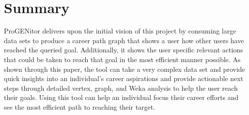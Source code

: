 \section{Summary}
\label{sect:summary}
ProGENitor delivers upon the initial vision of this project by consuming large
data sets to produce a career path graph that shows a user how other users
have reached the queried goal.  Additionally, it shows the user specific relevant actions
that could be taken to reach that goal in the most efficient manner possible.  As
shown through this paper, the tool can take a very complex data set and
provide quick insights into an individual's career aspirations and provide
actionable next steps through detailed vertex, graph, and Weka analysis to help
the user reach their goals.  Using this tool can help an individual focus their
career efforts and see the most efficient path to reaching their target.
